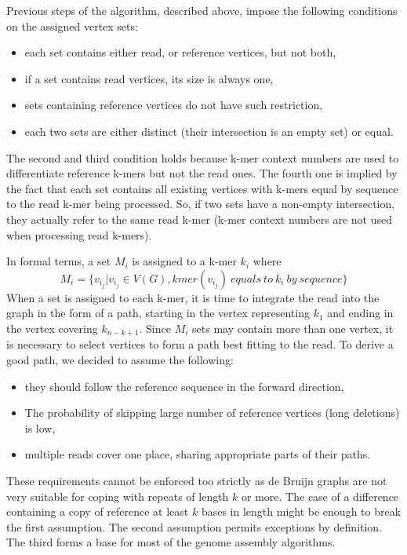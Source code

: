 Previous steps of the algorithm, described above, impose the following conditions on the assigned vertex sets:
\begin{itemize}
\item each set contains either read, or reference vertices, but not both,
\item if a set contains read vertices, its size is always one,
\item sets containing reference vertices do not have such restriction,
\item each two sets are either distinct (their intersection is an empty set) or equal.
\end{itemize}
The second and third condition holds because k-mer context numbers are used to differentiate reference k-mers but not the read ones. The fourth one is implied by the fact that each set contains all existing vertices with k-mers equal by sequence to the read k-mer being processed. So, if two sets have a non-empty intersection, they actually refer to the same read k-mer (k-mer context numbers are not used when processing read k-mers).

In formal terms, a set $M_i$ is assigned to a k-mer $k_i$ where
$$
M_i = \{v_{i_j} | v_{i_j} \in V(G), kmer(v_{i_j})\: equals\: to\: k_i\: by\: sequence\}
$$ 
When a set is assigned to each k-mer, it is time to integrate the read into the graph in the form of a path, starting in the vertex representing $k_1$ and ending in the vertex covering $k_{n-k+1}$. Since $M_i$ sets may contain more than one vertex, it is necessary to select vertices to form a path best fitting to the read. To derive a good path, we decided to assume the following:
\begin{itemize}
\item they should follow the reference sequence in the forward direction,
\item The probability of skipping large number of reference vertices (long deletions) is low,
\item multiple reads cover one place, sharing appropriate parts of their paths.
\end{itemize}

These requirements cannot be enforced too strictly as de Bruijn graphs are not very suitable for coping with repeats of length $k$ or more. The case of a difference containing a copy of reference at least $k$ bases in length might be enough to break the first assumption. The second assumption permits exceptions by definition. The third forms a base for most of the genome assembly algorithms.

